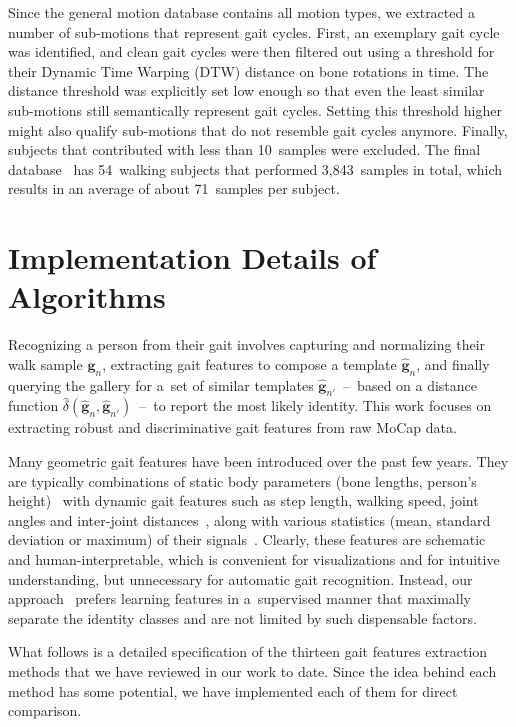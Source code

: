 \documentclass[10pt,a4paper]{llncs}
\newcommand{\gDELTAccH}[2]{\ensuremath{\gH{\delta}\left(#1,#2\right)}} %
\newcommand{\gGn}[1]{\ensuremath{\gB{g}_{#1}}} %
\newcommand{\gGnH}[1]{\ensuremath{\gH{\gB{g}}_{#1}}} %
\newcommand{\gB}[1]{\ensuremath{\mathbf{#1}}} %
\newcommand{\gH}[1]{\ensuremath{\widehat{#1}}} %
\begin{document}
Since the general motion database contains all motion types, we extracted a number of sub-motions that represent gait cycles. First, an exemplary gait cycle was identified, and clean gait cycles were then filtered out using a threshold for their Dynamic Time Warping (DTW) distance on bone rotations in time. The distance threshold was explicitly set low enough so that even the least similar sub-motions still semantically represent gait cycles. Setting this threshold higher might also qualify sub-motions that do not resemble gait cycles anymore. Finally, subjects that contributed with less than 10~samples were excluded. The final database~\cite{WWW2} has 54~walking subjects that performed 3,843~samples in total, which results in an average of about 71~samples per subject.
 
\section{Implementation Details of Algorithms}
\label{impl}

Recognizing a person from their gait involves capturing and normalizing their walk sample $\gGn{n}$, extracting gait features to compose a template $\gGnH{n}$, and finally querying the gallery for a~set of similar templates $\gGnH{n'}$~--~based on a distance function $\gDELTAccH{\gGnH{n}}{\gGnH{n'}}$~--~to report the most likely identity. This work focuses on extracting robust and discriminative gait features from raw MoCap data.

Many geometric gait features have been introduced over the past few years. They are typically combinations of static body parameters (bone lengths, person's height)~\cite{KKMJ14} with dynamic gait features such as step length, walking speed, joint angles and inter-joint distances~\cite{APG15,AA15,KKMJ14,RCA15}, along with various statistics (mean, standard deviation or maximum) of their signals~\cite{AWLSWZ16}. Clearly, these features are schematic and human-interpretable, which is convenient for visualizations and for intuitive understanding, but unnecessary for automatic gait recognition. Instead, our approach~\cite{BS16a,BS16b} prefers learning features in a~supervised manner that maximally separate the identity classes and are not limited by such dispensable factors.


What follows is a detailed specification of the thirteen gait features extraction methods that we have reviewed in our work to date. Since the idea behind each method has some potential, we have implemented each of them for direct comparison.
\end{document}
